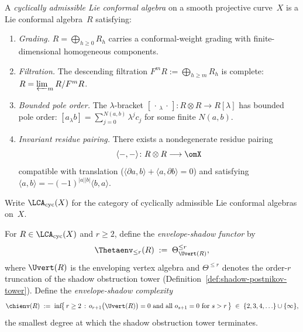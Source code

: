 \begin{definition}
\label{def:v1-cyclically-admissible-lca}
A \emph{cyclically admissible Lie conformal algebra} on a smooth
projective curve~$X$ is a Lie conformal algebra~$R$ satisfying:
\begin{enumerate}[label=\textup{(\roman*)}]
\item \emph{Grading.}
 $R = \bigoplus_{h \geq 0} R_h$ carries a conformal-weight grading
 with finite-dimensional homogeneous components.
\item \emph{Filtration.}
 The descending filtration
 $F^m R := \bigoplus_{h \geq m} R_h$ is complete:
 $R = \varprojlim_m R / F^m R$.
\item \emph{Bounded pole order.}
 The $\lambda$-bracket
 $[\,\cdot\,{}_\lambda\,\cdot\,]\colon R \otimes R \to R[\lambda]$
 has bounded pole order: $[a_\lambda b] = \sum_{j=0}^{N(a,b)}
 \lambda^j c_j$ for some finite $N(a,b)$.
\item \emph{Invariant residue pairing.}
 There exists a nondegenerate residue pairing
 \[
 \langle -, - \rangle \colon R \otimes R \longrightarrow \omX
 \]
 compatible with translation ($\langle \partial a, b \rangle
 + \langle a, \partial b \rangle = 0$) and satisfying
 $\langle a, b \rangle = -(-1)^{|a||b|} \langle b, a \rangle$.
\end{enumerate}
Write $\LCA_{\mathrm{cyc}}(X)$ for the category of cyclically
admissible Lie conformal algebras on~$X$.
\end{definition}

\begin{definition}
\label{def:envelope-shadow-functor-frontier}
For $R \in \LCA_{\mathrm{cyc}}(X)$ and $r \geq 2$, define the
\emph{envelope-shadow functor} by
\begin{equation}\label{eq:envelope-shadow-functor-frontier}
\Thetaenv_{\leq r}(R)
\;:=\;
\Theta^{\leq r}_{\Uvert(R)},
\end{equation}
where $\Uvert(R)$ is the enveloping vertex algebra and
$\Theta^{\leq r}$ denotes the order-$r$ truncation of the
shadow obstruction tower
(Definition~\ref{def:shadow-postnikov-tower}).
Define the \emph{envelope-shadow complexity}
\begin{equation}\label{eq:envelope-shadow-complexity-frontier}
\chienv(R)
\;:=\;
\inf\!\bigl\{\, r \geq 2 \,:\,
 o_{r+1}\bigl(\Uvert(R)\bigr) = 0
 \text{ and all } o_{s+1} = 0 \text{ for } s > r
\,\bigr\}
\;\in\;
\{2, 3, 4, \ldots\} \cup \{\infty\},
\end{equation}
the smallest degree at which the shadow obstruction tower terminates.
\end{definition}

